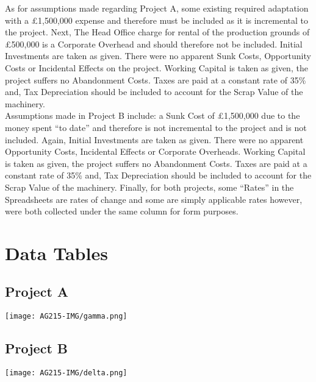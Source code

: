 \documentclass[11pt, english]{article}
\begin{document}
	As for assumptions made regarding Project A, some existing required adaptation with a \pounds1,500,000 expense and therefore must be included as it is incremental to the project. Next, The Head Office charge for rental of the production grounds of \pounds500,000 is a Corporate Overhead and should therefore not be included. Initial Investments are taken as given. There were no apparent Sunk Costs, Opportunity Costs or Incidental Effects on the project. Working Capital is taken as given, the project suffers no Abandonment Costs. Taxes are paid at a constant rate of 35\% and, Tax Depreciation should be included to account for the Scrap Value of the machinery.\\

	Assumptions made in Project B include: a Sunk Cost of \pounds1,500,000 due to the money spent ``to date'' and therefore is not incremental to the project and is not included. Again, Initial Investments are taken as given. There were no apparent Opportunity Costs, Incidental Effects or Corporate Overheads. Working Capital is taken as given, the project suffers no Abandonment Costs. Taxes are paid at a constant rate of 35\% and, Tax Depreciation should be included to account for the Scrap Value of the machinery. Finally, for both projects, some ``Rates'' in the Spreadsheets are rates of change and some are simply applicable rates however, were both collected under the same column for form purposes.

\newpage

\section{Data Tables}

	\subsection{Project A}

	\begin{center}
        	\texttt{[image: AG215-IMG/gamma.png]}
        \end{center}

	\subsection{Project B}

	\begin{center}
               	\texttt{[image: AG215-IMG/delta.png]}
        \end{center}
\end{document}
